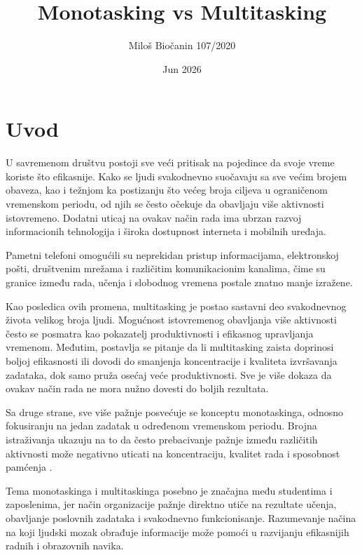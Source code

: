 \documentclass[12pt,a4paper]{article}
\title{Monotasking vs Multitasking}
\author{Miloš Biočanin 107/2020}
\date{Jun 2026}
\begin{document}
\maketitle
\thispagestyle{empty}
\newpage

\tableofcontents
\newpage

\section{Uvod}

U savremenom društvu postoji sve veći pritisak na pojedince da svoje vreme koriste što efikasnije. Kako se ljudi svakodnevno suočavaju sa sve većim brojem obaveza, kao i težnjom ka postizanju što većeg broja ciljeva u ograničenom vremenskom periodu, od njih se često očekuje da obavljaju više aktivnosti istovremeno. Dodatni uticaj na ovakav način rada ima ubrzan razvoj informacionih tehnologija i široka dostupnost interneta i mobilnih uređaja.

Pametni telefoni omogućili su neprekidan pristup informacijama, elektronskoj pošti, društvenim mrežama i različitim komunikacionim kanalima, čime su granice između rada, učenja i slobodnog vremena postale znatno manje izražene.

Kao posledica ovih promena, multitasking je postao sastavni deo svakodnevnog života velikog broja ljudi. Mogućnost istovremenog obavljanja više aktivnosti često se posmatra kao pokazatelj produktivnosti i efikasnog upravljanja vremenom. Međutim, postavlja se pitanje da li multitasking zaista doprinosi boljoj efikasnosti ili dovodi do smanjenja koncentracije i kvaliteta izvršavanja zadataka, dok samo pruža osećaj veće produktivnosti. Sve je više dokaza da ovakav način rada ne mora nužno dovesti do boljih rezultata.

Sa druge strane, sve više pažnje posvećuje se konceptu monotaskinga, odnosno fokusiranju na jedan zadatak u određenom vremenskom periodu. Brojna istraživanja ukazuju na to da često prebacivanje pažnje između različitih aktivnosti može negativno uticati na koncentraciju, kvalitet rada i sposobnost pamćenja \cite{watson2010, ophir2009}.

Tema monotaskinga i multitaskinga posebno je značajna među studentima i zaposlenima, jer način organizacije pažnje direktno utiče na rezultate učenja, obavljanje poslovnih zadataka i svakodnevno funkcionisanje. Razumevanje načina na koji ljudski mozak obrađuje informacije može pomoći u razvijanju efikasnijih radnih i obrazovnih navika.
\end{document}
